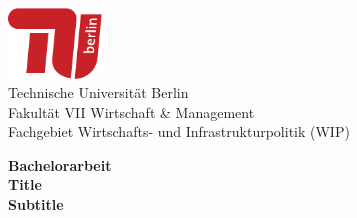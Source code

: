 \documentclass[
	11pt,								%
	DIV10,								%
	a4paper,         					%
	oneside,							%
	headheight=20pt,					%
	footheight=20pt,					%
    parskip=full,						%
    listof=totoc,						%
	bibliography=totoc,					%
	index=totoc,						%
]{scrartcl}
\begin{document}

	\thispagestyle{plain}
	\begin{titlepage}
		\vspace{0cm} 
		\begin{center}
			\includegraphics[width=2.5cm]{pictures/TU_Logo_kurz_4c_rot}\\
			\normalsize{Technische Universität Berlin}\\
			Fakultät VII Wirtschaft \& Management\\
			Fachgebiet Wirtschafts- und Infrastrukturpolitik (WIP)
		\end{center}
        \vfill
		\begin{center}
			\Large{\textbf{Bachelorarbeit}}\\
            \LARGE{\textbf{Title}}\\[2ex]
            \Large{\textbf{Subtitle}}
            
			\vfill
			






\end{center}
\end{titlepage}
\end{document}

